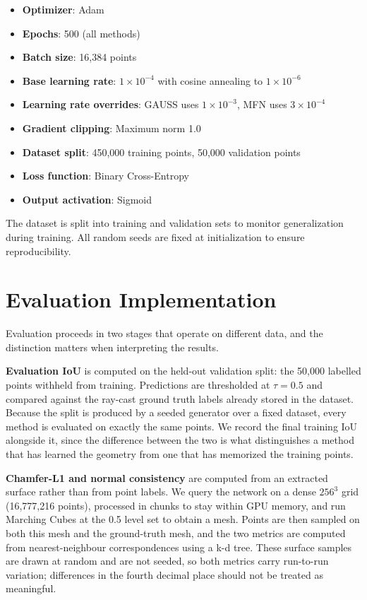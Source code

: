 \begin{itemize}
    \item \textbf{Optimizer}: Adam
    \item \textbf{Epochs}: 500 (all methods)
    \item \textbf{Batch size}: 16,384 points
    \item \textbf{Base learning rate}: $1 \times 10^{-4}$ with cosine annealing to $1 \times 10^{-6}$
    \item \textbf{Learning rate overrides}: GAUSS uses $1 \times 10^{-3}$, MFN uses $3 \times 10^{-4}$
    \item \textbf{Gradient clipping}: Maximum norm 1.0
    \item \textbf{Dataset split}: 450,000 training points, 50,000 validation points
    \item \textbf{Loss function}: Binary Cross-Entropy
    \item \textbf{Output activation}: Sigmoid
\end{itemize}

The dataset is split into training and validation sets to monitor generalization during training. All random seeds are fixed at initialization to ensure reproducibility.

\section{Evaluation Implementation}

Evaluation proceeds in two stages that operate on different data, and the distinction matters when interpreting the results.

\textbf{Evaluation IoU} is computed on the held-out validation split: the 50,000 labelled points withheld from training. Predictions are thresholded at $\tau = 0.5$ and compared against the ray-cast ground truth labels already stored in the dataset. Because the split is produced by a seeded generator over a fixed dataset, every method is evaluated on exactly the same points. We record the final training IoU alongside it, since the difference between the two is what distinguishes a method that has learned the geometry from one that has memorized the training points.

\textbf{Chamfer-L1 and normal consistency} are computed from an extracted surface rather than from point labels. We query the network on a dense $256^3$ grid (16,777,216 points), processed in chunks to stay within GPU memory, and run Marching Cubes at the 0.5 level set to obtain a mesh. Points are then sampled on both this mesh and the ground-truth mesh, and the two metrics are computed from nearest-neighbour correspondences using a k-d tree. These surface samples are drawn at random and are not seeded, so both metrics carry run-to-run variation; differences in the fourth decimal place should not be treated as meaningful.

